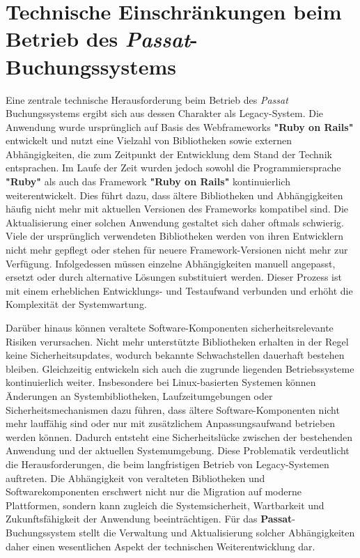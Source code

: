\section{Technische Einschränkungen beim Betrieb des \textit{Passat}-Buchungssystems}

Eine zentrale technische Herausforderung beim Betrieb des \textit{Passat} Buchungssystems ergibt sich aus dessen Charakter als Legacy-System. Die Anwendung wurde ursprünglich auf Basis des Webframeworks \textbf{"Ruby on Rails"} entwickelt und nutzt eine Vielzahl von Bibliotheken sowie externen Abhängigkeiten, die zum Zeitpunkt der Entwicklung dem Stand der Technik entsprachen. Im Laufe der Zeit wurden jedoch sowohl die Programmiersprache \textbf{"Ruby"} als auch das Framework \textbf{"Ruby on Rails"} kontinuierlich weiterentwickelt. Dies führt dazu, dass ältere Bibliotheken und Abhängigkeiten häufig nicht mehr mit aktuellen Versionen des Frameworks kompatibel sind.
Die Aktualisierung einer solchen Anwendung gestaltet sich daher oftmals schwierig. Viele der ursprünglich verwendeten Bibliotheken werden von ihren Entwicklern nicht mehr gepflegt oder stehen für neuere Framework-Versionen nicht mehr zur Verfügung. Infolgedessen müssen einzelne Abhängigkeiten manuell angepasst, ersetzt oder durch alternative Lösungen substituiert werden. Dieser Prozess ist mit einem erheblichen Entwicklungs- und Testaufwand verbunden und erhöht die Komplexität der Systemwartung.

Darüber hinaus können veraltete Software-Komponenten sicherheitsrelevante Risiken verursachen. Nicht mehr unterstützte Bibliotheken erhalten in der Regel keine Sicherheitsupdates, wodurch bekannte Schwachstellen dauerhaft bestehen bleiben. Gleichzeitig entwickeln sich auch die zugrunde liegenden Betriebssysteme kontinuierlich weiter. Insbesondere bei Linux-basierten Systemen können Änderungen an Systembibliotheken, Laufzeitumgebungen oder Sicherheitsmechanismen dazu führen, dass ältere Software-Komponenten nicht mehr lauffähig sind oder nur mit zusätzlichem Anpassungsaufwand betrieben werden können. Dadurch entsteht eine Sicherheitslücke zwischen der bestehenden Anwendung und der aktuellen Systemumgebung. Diese Problematik verdeutlicht die Herausforderungen, die beim langfristigen Betrieb von Legacy-Systemen auftreten. Die Abhängigkeit von veralteten Bibliotheken und Softwarekomponenten erschwert nicht nur die Migration auf moderne Plattformen, sondern kann zugleich die Systemsicherheit, Wartbarkeit und Zukunftsfähigkeit der Anwendung beeinträchtigen. Für das \textbf{Passat}-Buchungssystem stellt die Verwaltung und Aktualisierung solcher Abhängigkeiten daher einen wesentlichen Aspekt der technischen Weiterentwicklung dar.

